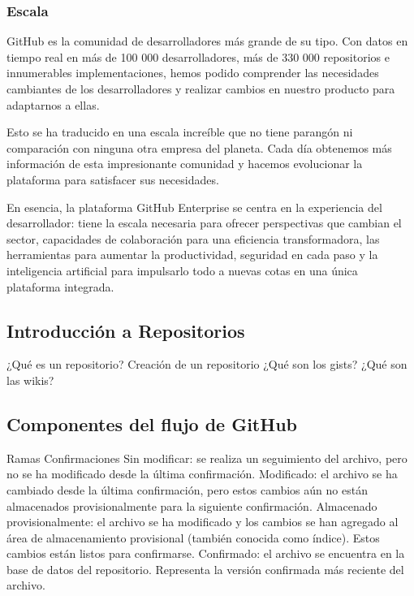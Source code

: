 \subsubsection*{Escala}

GitHub es la comunidad de desarrolladores más grande de su tipo. Con datos en tiempo real en más de 100 000 desarrolladores, más de 330 000 repositorios e innumerables implementaciones, hemos podido comprender las necesidades cambiantes de los desarrolladores y realizar cambios en nuestro producto para adaptarnos a ellas.

Esto se ha traducido en una escala increíble que no tiene parangón ni comparación con ninguna otra empresa del planeta. Cada día obtenemos más información de esta impresionante comunidad y hacemos evolucionar la plataforma para satisfacer sus necesidades.

En esencia, la plataforma GitHub Enterprise se centra en la experiencia del desarrollador: tiene la escala necesaria para ofrecer perspectivas que cambian el sector, capacidades de colaboración para una eficiencia transformadora, las herramientas para aumentar la productividad, seguridad en cada paso y la inteligencia artificial para impulsarlo todo a nuevas cotas en una única plataforma integrada.

\subsection*{Introducción a Repositorios}

¿Qué es un repositorio?
Creación de un repositorio
¿Qué son los gists?
¿Qué son las wikis?


\subsection*{Componentes del flujo de GitHub}

Ramas
Confirmaciones
    Sin modificar: se realiza un seguimiento del archivo, pero no se ha modificado desde la última confirmación.
    Modificado: el archivo se ha cambiado desde la última confirmación, pero estos cambios aún no están almacenados provisionalmente para la siguiente confirmación.
    Almacenado provisionalmente: el archivo se ha modificado y los cambios se han agregado al área de almacenamiento provisional (también conocida como índice). Estos cambios están listos para confirmarse.
    Confirmado: el archivo se encuentra en la base de datos del repositorio. Representa la versión confirmada más reciente del archivo.


